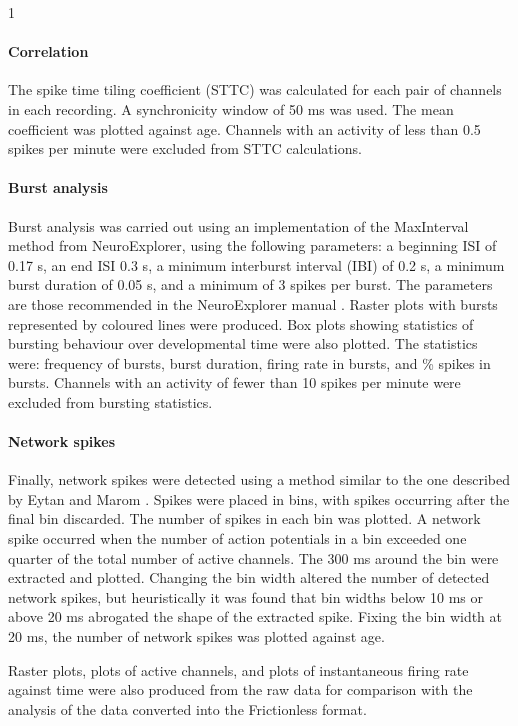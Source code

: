 1\documentclass[11pt]{article}
\begin{document}
{\paragraph{Correlation} The spike time tiling coefficient (STTC) \cite{Cutts2014} was calculated for each pair of channels in each recording. A synchronicity window of 50 ms was used. The mean coefficient was plotted against age. Channels with an activity of less than 0.5 spikes per minute were excluded from STTC calculations.

\paragraph{Burst analysis} Burst analysis was carried out using an implementation of the MaxInterval method from NeuroExplorer, using the following parameters: a beginning ISI of 0.17 s, an end ISI 0.3 s, a minimum interburst interval (IBI) of 0.2 s, a minimum burst duration of 0.05 s, and a minimum of 3 spikes per burst. The parameters are those recommended in the NeuroExplorer manual \cite{neuroexplorer2020}. Raster plots with bursts represented by coloured lines were produced. Box plots showing statistics of bursting behaviour over developmental time were also plotted. The statistics were: frequency of bursts, burst duration, firing rate in bursts, and \% spikes in bursts. Channels with an activity of fewer than 10 spikes per minute were excluded from bursting statistics.

\paragraph{Network spikes} Finally, network spikes were detected using a method similar to the one described by Eytan and Marom \cite{Eytan2006}. Spikes were placed in bins, with spikes occurring after the final bin discarded. The number of spikes in each bin was plotted. A network spike occurred when the number of action potentials in a bin exceeded one quarter of the total number of active channels. The 300 ms around the bin were extracted and plotted. Changing the bin width altered the number of detected network spikes, but heuristically it was found that bin widths below 10 ms or above 20 ms abrogated the shape of the extracted spike. Fixing the bin width at 20 ms, the number of network spikes was plotted against age.

\par Raster plots, plots of active channels, and plots of instantaneous firing rate against time were also produced from the raw data for comparison with the analysis of the data converted into the Frictionless format.


}
\end{document}
